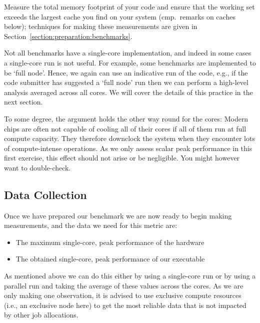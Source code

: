 

\noindent
Measure the total memory footprint of your code and ensure that the working set exceeds the largest cache you find on your system (cmp.~remarks on caches below); techniques for making these measurements are given in Section~\ref{section:preparation:benchmarks}.


Not all benchmarks have a single-core implementation, and indeed in some cases a single-core run is not useful. For example, some benchmarks are implemented to be `full node'. Hence, we again can use an indicative run of the code, e.g., if the code submitter has suggested a `full node' run then we can perform a high-level analysis averaged across all cores. We will cover the details of this practice in the next section.


To some degree, the argument holds the other way round for the cores:
Modern chips are often not capable of cooling all of their cores if all of them
run at full compute capacity.
They therefore downclock the system when they encounter lots of compute-intense
operations.
As we only assess scalar peak performance in this first exercise, this
effect should not arise or be negligible. 
You might however want to double-check.

\subsection{Data Collection}

Once we have prepared our benchmark we are now ready to begin making measurements, and the data we need for this metric are:
\begin{itemize}
\item The maximum single-core, peak performance of the hardware
\item The obtained single-core, peak performance of our executable
\end{itemize}
As mentioned above we can do this either by using a single-core run or by using a parallel run and taking the average of these values across the cores. As we are only making one observation, it is advised to use exclusive compute resources (i.e., an exclusive node here) to get the most reliable data that is not impacted by other job allocations.

